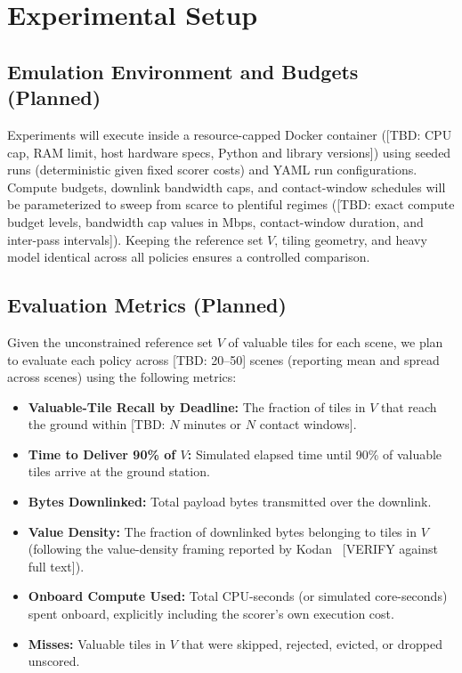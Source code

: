 \documentclass[conference]{IEEEtran}
\begin{document}
\section{Experimental Setup}

\subsection{Emulation Environment and Budgets (Planned)}
Experiments will execute inside a resource-capped Docker container ([TBD: CPU cap, RAM limit, host hardware specs, Python and library versions]) using seeded runs (deterministic given fixed scorer costs) and YAML run configurations. Compute budgets, downlink bandwidth caps, and contact-window schedules will be parameterized to sweep from scarce to plentiful regimes ([TBD: exact compute budget levels, bandwidth cap values in Mbps, contact-window duration, and inter-pass intervals]). Keeping the reference set $V$, tiling geometry, and heavy model identical across all policies ensures a controlled comparison.

\subsection{Evaluation Metrics (Planned)}
Given the unconstrained reference set $V$ of valuable tiles for each scene, we plan to evaluate each policy across [TBD: 20--50] scenes (reporting mean and spread across scenes) using the following metrics:
\begin{itemize}
    \item \textbf{Valuable-Tile Recall by Deadline:} The fraction of tiles in $V$ that reach the ground within [TBD: $N$ minutes or $N$ contact windows].
    \item \textbf{Time to Deliver 90\% of $V$:} Simulated elapsed time until 90\% of valuable tiles arrive at the ground station.
    \item \textbf{Bytes Downlinked:} Total payload bytes transmitted over the downlink.
    \item \textbf{Value Density:} The fraction of downlinked bytes belonging to tiles in $V$ (following the value-density framing reported by Kodan~\cite{kodan} [VERIFY against full text]).
    \item \textbf{Onboard Compute Used:} Total CPU-seconds (or simulated core-seconds) spent onboard, explicitly including the scorer's own execution cost.
    \item \textbf{Misses:} Valuable tiles in $V$ that were skipped, rejected, evicted, or dropped unscored.
\end{itemize}
\end{document}
